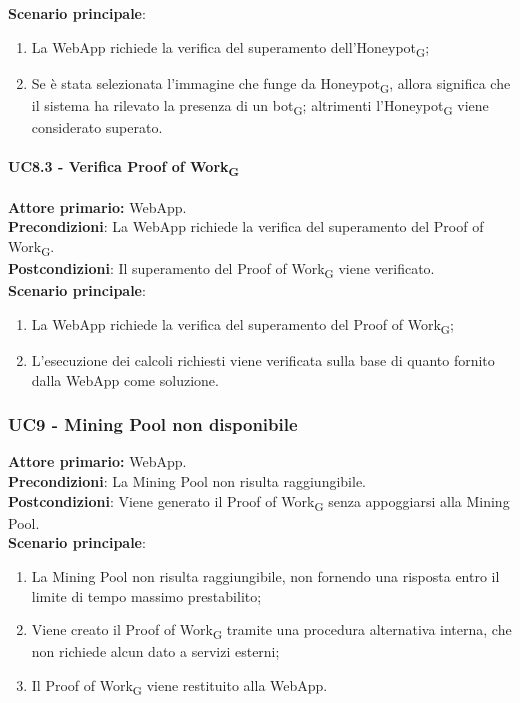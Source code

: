 \textbf{Scenario principale}:
\begin{enumerate}
    \item La WebApp richiede la verifica del superamento dell'Honeypot\textsubscript{G};
    \item Se è stata selezionata l'immagine che funge da Honeypot\textsubscript{G}, allora significa che il sistema ha rilevato la presenza di un bot\textsubscript{G}; altrimenti l'Honeypot\textsubscript{G} viene considerato superato.
\end{enumerate}

\paragraph{UC8.3 - Verifica Proof of Work\textsubscript{G}}
\textbf{Attore primario:} WebApp.\\
\textbf{Precondizioni}: La WebApp richiede la verifica del superamento del Proof of Work\textsubscript{G}.\\
\textbf{Postcondizioni}: Il superamento del Proof of Work\textsubscript{G} viene verificato.\\

\textbf{Scenario principale}:
\begin{enumerate}
    \item La WebApp richiede la verifica del superamento del Proof of Work\textsubscript{G};
    \item L'esecuzione dei calcoli richiesti viene verificata sulla base di quanto fornito dalla WebApp come soluzione.
\end{enumerate}

\subsubsection{UC9  - Mining Pool non disponibile}
\textbf{Attore primario:} WebApp.\\
\textbf{Precondizioni}: La Mining Pool non risulta raggiungibile.\\
\textbf{Postcondizioni}: Viene generato il Proof of Work\textsubscript{G} senza appoggiarsi alla Mining Pool.\\

\textbf{Scenario principale}:
\begin{enumerate}
    \item La Mining Pool non risulta raggiungibile, non fornendo una risposta entro il limite di tempo massimo prestabilito;
    \item Viene creato il Proof of Work\textsubscript{G} tramite una procedura alternativa interna, che non richiede alcun dato a servizi esterni;
    \item Il Proof of Work\textsubscript{G} viene restituito alla WebApp.
\end{enumerate}

